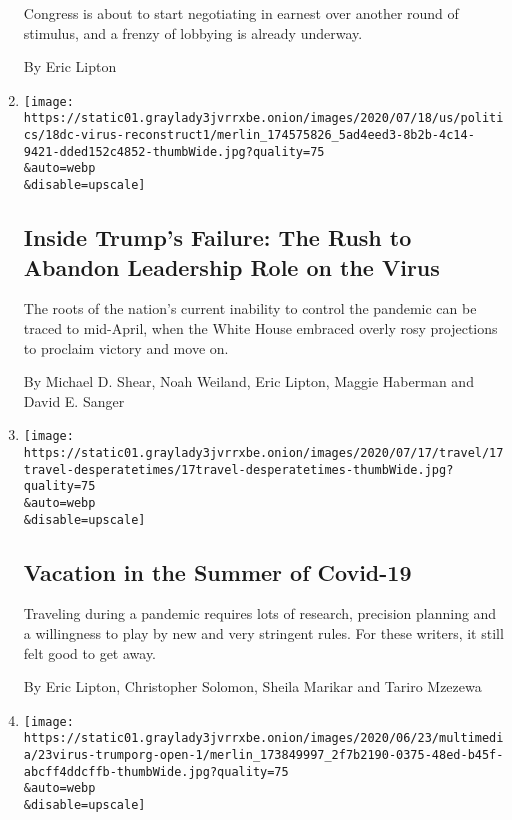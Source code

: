 \begin{enumerate}
  Congress is about to start negotiating in earnest over another round
  of stimulus, and a frenzy of lobbying is already underway.

  By Eric Lipton
\item
  \href{/2020/07/18/us/politics/trump-coronavirus-response-failure-leadership.html}{}

  \texttt{[image: https://static01.graylady3jvrrxbe.onion/images/2020/07/18/us/politics/18dc-virus-reconstruct1/merlin\_174575826\_5ad4eed3-8b2b-4c14-9421-dded152c4852-thumbWide.jpg?quality=75\\\&auto=webp\\\&disable=upscale]}

  \hypertarget{inside-trumps-failure-the-rush-to-abandon-leadership-role-on-the-virus}{%
  \subsection{Inside Trump's Failure: The Rush to Abandon Leadership
  Role on the
  Virus}\label{inside-trumps-failure-the-rush-to-abandon-leadership-role-on-the-virus}}

  The roots of the nation's current inability to control the pandemic
  can be traced to mid-April, when the White House embraced overly rosy
  projections to proclaim victory and move on.

  By Michael D. Shear, Noah Weiland, Eric Lipton, Maggie Haberman and
  David E. Sanger
\item
  \href{/2020/07/16/travel/virus-vacation.html}{}

  \texttt{[image: https://static01.graylady3jvrrxbe.onion/images/2020/07/17/travel/17travel-desperatetimes/17travel-desperatetimes-thumbWide.jpg?quality=75\\\&auto=webp\\\&disable=upscale]}

  \hypertarget{vacation-in-the-summer-of-covid-19}{%
  \subsection{Vacation in the Summer of
  Covid-19}\label{vacation-in-the-summer-of-covid-19}}

  Traveling during a pandemic requires lots of research, precision
  planning and a willingness to play by new and very stringent rules.
  For these writers, it still felt good to get away.

  By Eric Lipton, Christopher Solomon, Sheila Marikar and Tariro Mzezewa
\item
  \href{/2020/06/23/us/trump-doral-reopen-coronavirus.html}{}

  \texttt{[image: https://static01.graylady3jvrrxbe.onion/images/2020/06/23/multimedia/23virus-trumporg-open-1/merlin\_173849997\_2f7b2190-0375-48ed-b45f-abcff4ddcffb-thumbWide.jpg?quality=75\\\&auto=webp\\\&disable=upscale]}


\end{enumerate}

